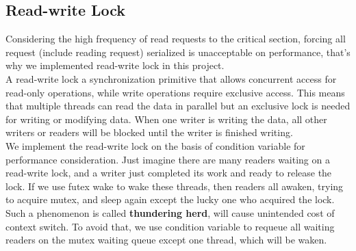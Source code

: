 \documentclass{article}
\begin{document}
\subsection{Read-write Lock}
Considering the high frequency of read requests to the critical section, forcing all request (include reading request) serialized is unacceptable on performance, that's why we implemented read-write lock in this project.\\
A read-write lock a synchronization primitive that allows concurrent access for read-only operations, while write operations require exclusive access. This means that multiple threads can read the data in parallel but an exclusive lock is needed for writing or modifying data. When one writer is writing the data, all other writers or readers will be blocked until the writer is finished writing.\\
We implement the read-write lock on the basis of condition variable for performance consideration. Just imagine there are many readers waiting on a read-write lock, and a writer just completed its work and ready to release the lock. If we use futex wake to wake these threads, then readers all awaken, trying to acquire mutex, and sleep again except the lucky one who acquired the lock. Such a phenomenon is called \textbf{thundering herd}, will cause unintended cost of context switch. To avoid that, we use condition variable to requeue all waiting readers on the mutex waiting queue except one thread, which will be waken.
\end{document}
